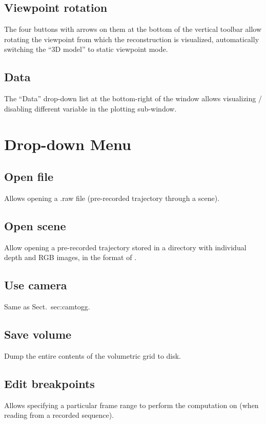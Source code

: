 \documentclass[12pt]{article}
\begin{document}
\subsection{Viewpoint rotation}
The four buttons with arrows on them at the bottom of the vertical toolbar allow rotating the viewpoint from which the reconstruction is visualized, automatically switching the ``3D model'' to static viewpoint mode.

\subsection{Data}
The ``Data'' drop-down list at the bottom-right of the window allows visualizing / disabling different variable in the plotting sub-window.

\section{Drop-down Menu}

\subsection{Open file}
Allows opening a .raw file (pre-recorded trajectory through a scene).

\subsection{Open scene}
Allow opening a pre-recorded trajectory stored in a directory with individual depth and RGB images, in the format of \cite{2014Handa}.

\subsection{Use camera}
Same as Sect.~{sec:camtogg}.

\subsection{Save volume}
Dump the entire contents of the volumetric grid to disk.

\subsection{Edit breakpoints}
Allows specifying a particular frame range to perform the computation on (when reading from a recorded sequence).
\end{document}
